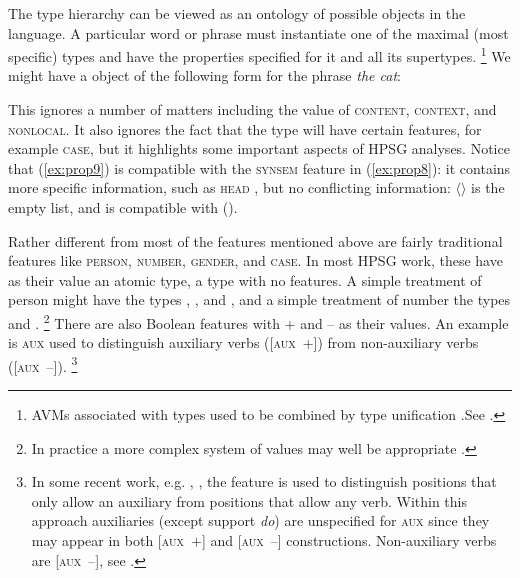 \documentclass[output=paper
	        ,collection
	        ,collectionchapter
 	        ,biblatex
                ,babelshorthands
                ,newtxmath
                ,draftmode
                ,colorlinks, citecolor=brown
]{langscibook}
\begin{document}
The type hierarchy can be viewed as an ontology of possible objects in the language. A particular word or phrase must instantiate one of the maximal (most specific) types and have the properties specified for it and all its supertypes.%
%
\footnote{AVMs associated with types used to be combined by type unification \citep[Section~2]{ps}.\inlineaddpages See .}
%
We might have a  object of the following form for the phrase \emph{the cat}:

\ea\label{ex:prop9}
\z

This ignores a number of matters including the value of \textsc{content, context}, and \textsc{nonlocal}. It also ignores the fact that the type  will have certain features, for example \textsc{case}, but it highlights some important aspects of HPSG analyses. Notice that (\ref{ex:prop9}) is compatible with the \textsc{synsem} feature in (\ref{ex:prop8}): it contains more specific information, such as \textsc{head} , but no conflicting information: $\langle \rangle$ is the empty list, and is compatible with ().

Rather different from most of the features mentioned above are fairly traditional features like \textsc{person, number, gender}, and \textsc{case}. In most HPSG work, these have as their value an atomic type, a type with no features. A simple treatment of person might have the types , , and , and a simple treatment of number the types  and .%
%
\footnote{In practice a more complex system of values may well be appropriate \citep[Section~3]{Flickinger2000a}.}
%
There are also Boolean features with + and – as their values. An example is \textsc{aux} used to distinguish auxiliary verbs ([\textsc{aux}~+]) from non-auxiliary verbs ([\textsc{aux}~–]).%
%
\footnote{In some recent work, e.g. \citet[157--162]{Sag2012a}, \citet{Sag2020a}, the feature is used to distinguish positions that only allow an auxiliary from positions that allow any verb. Within this approach auxiliaries (except support \emph{do}) are unspecified for \textsc{aux} since they may appear in both [\textsc{aux}~$+$] and [\textsc{aux}~$–$] constructions. Non-auxiliary verbs are [\textsc{aux}~$–$], see .}
%
\end{document}
